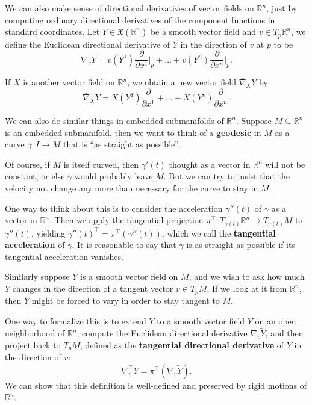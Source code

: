 \documentclass[../main.tex]{subfiles}
\begin{document}
We can also make sense of directional derivatives of vector fields on $\mathbb{R}^n$, just by computing ordinary directional derivatives of the component functions in standard coordinates. Let $Y \in \mathfrak{X}(\mathbb{R}^n)$ be a smooth vector field and $v \in T_p \mathbb{R}^n$, we define the Euclidean directional derivative of $Y$ in the direction of $v$ at $p$ to be
\begin{equation}
	\bar{\nabla}_v Y = v(Y^1) \frac{\partial}{\partial x^1} \bigg|_p + \ldots + v(Y^n) \frac{\partial}{\partial x^n} \bigg|_p.
\end{equation}

If $X$ is another vector field on $\mathbb{R}^n$, we obtain a new vector field $\bar{\nabla}_X Y$ by
\begin{equation}
	\bar{\nabla}_X Y = X(Y^1) \frac{\partial}{\partial x^1} + \ldots + X(Y^n) \frac{\partial}{\partial x^n}.
\end{equation}

We can also do similar things in embedded submanifolds of $\mathbb{R}^n$. Suppose $M \subseteq \mathbb{R}^n$ is an embedded submanifold, then we want to think of a \textbf{geodesic} in $M$ as a curve $\gamma: I \to M$ that is ``as straight as possible''.
\begin{remark}
	Of course, if $M$ is itself curved, then $\gamma'(t)$ thought as a vector in $\mathbb{R}^n$ will not be constant, or else $\gamma$ would probably leave $M$. But we can try to insist that the velocity not change any more than necessary for the curve to stay in $M$.
\end{remark}
One way to think about this is to consider the acceleration $\gamma''(t)$ of $\gamma$ as a vector in $\mathbb{R}^n$. Then we apply the tangential projection $\pi^{\top}: T_{\gamma(t)} \mathbb{R}^n \to T_{\gamma(t)} M$ to $\gamma''(t)$, yielding $\gamma''(t)^{\top} = \pi^{\top}(\gamma''(t))$, which we call the \textbf{tangential acceleration} of $\gamma$. It is reasonable to say that $\gamma$ is as straight as possible if its tangential acceleration vanishes.

Similarly suppose $Y$ is a smooth vector field on $M$, and we wish to ask how much $Y$ changes in the direction of a tangent vector $v \in T_p M$. If we look at it from $\mathbb{R}^n$, then $Y$ might be forced to vary in order to stay tangent to $M$.

One way to formalize this is to extend $Y$ to a smooth vector field $\tilde{Y}$ on an open neighborhood of $\mathbb{R}^n$, compute the Euclidean directional derivative $\bar{\nabla}_v \tilde{Y}$, and then project back to $T_p M$, defined as the \textbf{tangential directional derivative} of $Y$ in the direction of $v$:
\begin{equation}
	\nabla_v^{\top} Y = \pi^{\top}(\bar{\nabla}_v \tilde{Y}).
\end{equation}
We can show that this definition is well-defined and preserved by rigid motions of $\mathbb{R}^n$.
\end{document}
